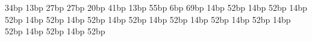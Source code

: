 34bp 13bp 
27bp 27bp 
20bp 41bp 
13bp 55bp 
6bp 69bp 
14bp 52bp 
14bp 52bp 
14bp 52bp 
14bp 52bp 
14bp 52bp 
14bp 52bp 
14bp 52bp 
14bp 52bp 
14bp 52bp 
14bp 52bp 
14bp 52bp 
14bp 52bp 
